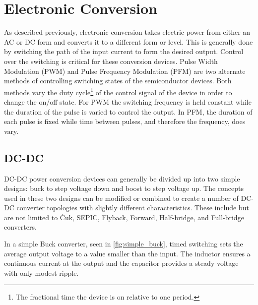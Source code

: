 \section{Electronic Conversion}
As described previously, electronic conversion takes electric power from either an AC or DC form and converts it to a different form or level. This is generally done by switching the path of the input current to form the desired output. Control over the switching is critical for these conversion devices. Pulse Width Modulation (PWM) and Pulse Frequency Modulation (PFM) are two alternate methods of controlling switching states of the semiconductor devices. Both methods vary the duty cycle\footnote{The fractional time the device is on relative to one period.} of the control signal of the device in order to change the on/off state. For PWM the switching frequency is held constant while the duration of the pulse is varied to control the output. In PFM, the duration of each pulse is fixed while time between pulses, and therefore the frequency, does vary.


\subsection{DC-DC}
DC-DC power conversion devices can generally be divided up into two simple designs: buck to step voltage down and boost to step voltage up. The concepts used in these two designs can be modified or combined to create a number of  DC-DC converter topologies with slightly different characteristics. These include but are not limited to \'Cuk, SEPIC, Flyback, Forward, Half-bridge, and Full-bridge converters. \cite{Mohan2003}

In a simple Buck converter, seen in \autoref{fig:simple_buck}, timed switching sets the average output voltage to a value smaller than the input. The inductor ensures a continuous current at the output and the capacitor provides a steady voltage with only modest ripple. 

